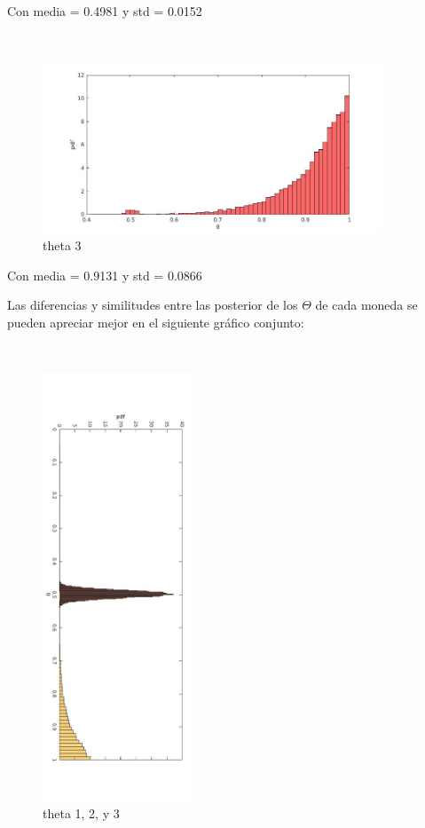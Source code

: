 Con media = 0.4981 y std = 0.0152

~\\
\begin{figure}[h]
    \includegraphics[width=0.9\textwidth]{imagenes/theta3.jpg}
  \caption{theta 3}
\end{figure}

Con media = 0.9131 y std = 0.0866

\newpage

Las diferencias y similitudes entre las posterior de los $\Theta$ de cada moneda se pueden apreciar mejor en el siguiente gráfico conjunto:

~\\
\begin{figure}[h]
    \includegraphics[width=0.4\textwidth]{imagenes/conjunta.jpg}
  \caption{theta 1, 2, y 3}
\end{figure}
~\\

